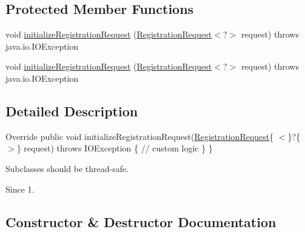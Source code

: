 \subsection*{Protected Member Functions}
\begin{DoxyCompactItemize}
\item 
void \hyperlink{classcom_1_1example_1_1lusifer_1_1myapplication_1_1backend_1_1registration_1_1_registration_request_initializer_a32f2b91f9d66573bc9f814bcebd43f6f}{initialize\+Registration\+Request} (\hyperlink{classcom_1_1example_1_1lusifer_1_1myapplication_1_1backend_1_1registration_1_1_registration_request}{Registration\+Request}$<$?$>$ request)  throws java.\+io.\+I\+O\+Exception 
\item 
void \hyperlink{classcom_1_1example_1_1lusifer_1_1myapplication_1_1backend_1_1registration_1_1_registration_request_initializer_a32f2b91f9d66573bc9f814bcebd43f6f}{initialize\+Registration\+Request} (\hyperlink{classcom_1_1example_1_1lusifer_1_1myapplication_1_1backend_1_1registration_1_1_registration_request}{Registration\+Request}$<$?$>$ request)  throws java.\+io.\+I\+O\+Exception 
\end{DoxyCompactItemize}


\subsection{Detailed Description}
Override public void initialize\+Registration\+Request(\hyperlink{classcom_1_1example_1_1lusifer_1_1myapplication_1_1backend_1_1registration_1_1_registration_request}{Registration\+Request}\{ $<$\}?\{ $>$\} request) throws I\+O\+Exception \{ // custom logic \} \} 

Subclasses should be thread-\/safe. 

\begin{DoxySince}{Since}
1. 
\end{DoxySince}


\subsection{Constructor \& Destructor Documentation}
\hypertarget{classcom_1_1example_1_1lusifer_1_1myapplication_1_1backend_1_1registration_1_1_registration_request_initializer_a1fcebc896e0a138510799819494d353e}{}
